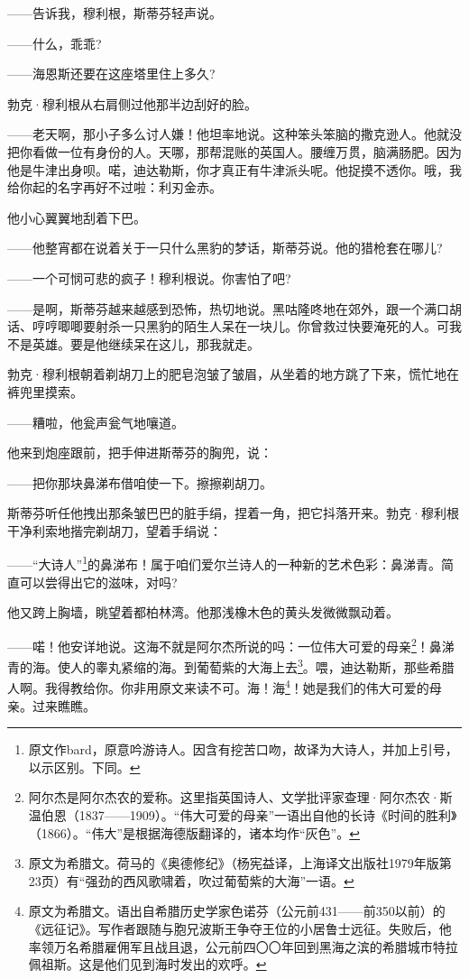 \par ——告诉我，穆利根，斯蒂芬轻声说。
\par ——什么，乖乖?
\par ——海恩斯还要在这座塔里住上多久?
\par 勃克·穆利根从右肩侧过他那半边刮好的脸。
\par ——老天啊，那小子多么讨人嫌！他坦率地说。这种笨头笨脑的撒克逊人。他就没把你看做一位有身份的人。天哪，那帮混账的英国人。腰缠万贯，脑满肠肥。因为他是牛津出身呗。喏，迪达勒斯，你才真正有牛津派头呢。他捉摸不透你。哦，我给你起的名字再好不过啦：利刃金赤。
\par 他小心翼翼地刮着下巴。
\par ——他整宵都在说着关于一只什么黑豹的梦话，斯蒂芬说。他的猎枪套在哪儿?
\par ——一个可悯可悲的疯子！穆利根说。你害怕了吧?
\par ——是啊，斯蒂芬越来越感到恐怖，热切地说。黑咕隆咚地在郊外，跟一个满口胡话、哼哼唧唧要射杀一只黑豹的陌生人呆在一块儿。你曾救过快要淹死的人。可我不是英雄。要是他继续呆在这儿，那我就走。
\par 勃克·穆利根朝着剃胡刀上的肥皂泡皱了皱眉，从坐着的地方跳了下来，慌忙地在裤兜里摸索。
\par ——糟啦，他瓮声瓮气地嚷道。
\par 他来到炮座跟前，把手伸进斯蒂芬的胸兜，说：
\par ——把你那块鼻涕布借咱使一下。擦擦剃胡刀。
\par 斯蒂芬听任他拽出那条皱巴巴的脏手绢，捏着一角，把它抖落开来。勃克·穆利根干净利索地揩完剃胡刀，望着手绢说：
\par ——“大诗人”\footnote{原文作bard，原意吟游诗人。因含有挖苦口吻，故译为大诗人，并加上引号，以示区别。下同。}的鼻涕布！属于咱们爱尔兰诗人的一种新的艺术色彩：鼻涕青。简直可以尝得出它的滋味，对吗?
\par 他又跨上胸墙，眺望着都柏林湾。他那浅橡木色的黄头发微微飘动着。
\par ——喏！他安详地说。这海不就是阿尔杰所说的吗：一位伟大可爱的母亲\footnote{阿尔杰是阿尔杰农的爱称。这里指英国诗人、文学批评家查理·阿尔杰农·斯温伯恩（1837——1909）。“伟大可爱的母亲”一语出自他的长诗《时间的胜利》（1866）。“伟大”是根据海德版翻译的，诸本均作“灰色”。}！鼻涕青的海。使人的睾丸紧缩的海。到葡萄紫的大海上去\footnote{原文为希腊文。荷马的《奥德修纪》（杨宪益译，上海译文出版社1979年版第23页）有“强劲的西风歌啸着，吹过葡萄紫的大海”一语。}。喂，迪达勒斯，那些希腊人啊。我得教给你。你非用原文来读不可。海！海\footnote{原文为希腊文。语出自希腊历史学家色诺芬（公元前431——前350以前）的《远征记》。写作者跟随与胞兄波斯王争夺王位的小居鲁士远征。失败后，他率领万名希腊雇佣军且战且退，公元前四〇〇年回到黑海之滨的希腊城市特拉佩祖斯。这是他们见到海时发出的欢呼。}！她是我们的伟大可爱的母亲。过来瞧瞧。
